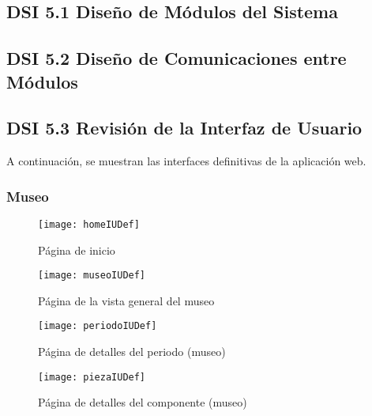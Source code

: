 \subsection{DSI 5.1 Diseño de Módulos del Sistema}

\subsection{DSI 5.2 Diseño de Comunicaciones entre Módulos}

\subsection{DSI 5.3 Revisión de la Interfaz de Usuario}
A continuación, se muestran las interfaces definitivas de la aplicación web.
\subsubsection{Museo}
\begin{figure}[H]
\centering
\texttt{[image: homeIUDef]}
\caption{Página de inicio}
\end{figure}
\begin{figure}[H]
\centering
\texttt{[image: museoIUDef]}
\caption{Página de la vista general del museo}
\end{figure}
\begin{figure}[H]
\centering
\texttt{[image: periodoIUDef]}
\caption{Página de detalles del periodo (museo)}
\end{figure}
\begin{figure}[H]
\centering
\texttt{[image: piezaIUDef]}
\caption{Página de detalles del componente (museo)}
\end{figure}

